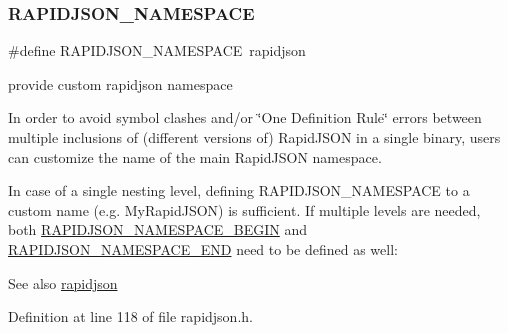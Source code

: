\subsubsection{\texorpdfstring{RAPIDJSON\_NAMESPACE}{RAPIDJSON\_NAMESPACE}}
{\footnotesize\ttfamily \#define R\+A\+P\+I\+D\+J\+S\+O\+N\+\_\+\+N\+A\+M\+E\+S\+P\+A\+CE~rapidjson}



provide custom rapidjson namespace 

In order to avoid symbol clashes and/or \char`\"{}\+One Definition Rule\char`\"{} errors between multiple inclusions of (different versions of) Rapid\+J\+S\+ON in a single binary, users can customize the name of the main Rapid\+J\+S\+ON namespace.

In case of a single nesting level, defining {\ttfamily R\+A\+P\+I\+D\+J\+S\+O\+N\+\_\+\+N\+A\+M\+E\+S\+P\+A\+CE} to a custom name (e.\+g. {\ttfamily My\+Rapid\+J\+S\+ON}) is sufficient. If multiple levels are needed, both \mbox{\hyperlink{group___r_a_p_i_d_j_s_o_n___c_o_n_f_i_g_gad3806c8251fdc7da9618b7e922674ffc}{R\+A\+P\+I\+D\+J\+S\+O\+N\+\_\+\+N\+A\+M\+E\+S\+P\+A\+C\+E\+\_\+\+B\+E\+G\+IN}} and \mbox{\hyperlink{group___r_a_p_i_d_j_s_o_n___c_o_n_f_i_g_gaf18f052a98b9f5df5448d39484b743c1}{R\+A\+P\+I\+D\+J\+S\+O\+N\+\_\+\+N\+A\+M\+E\+S\+P\+A\+C\+E\+\_\+\+E\+ND}} need to be defined as well\+:


\begin{DoxyCode}{0}
\DoxyCodeLine{\textcolor{comment}{// in some .cpp file}}
\DoxyCodeLine{\textcolor{preprocessor}{\#define RAPIDJSON\_NAMESPACE my::rapidjson}}
\DoxyCodeLine{\textcolor{preprocessor}{\#define RAPIDJSON\_NAMESPACE\_END   \} \}}}
\DoxyCodeLine{\textcolor{preprocessor}{\#include "rapidjson/..."}}
\end{DoxyCode}


\begin{DoxySeeAlso}{See also}
\mbox{\hyperlink{namespacerapidjson}{rapidjson}} 
\end{DoxySeeAlso}


Definition at line 118 of file rapidjson.\+h.

\mbox{\label{group___r_a_p_i_d_j_s_o_n___c_o_n_f_i_g_gad3806c8251fdc7da9618b7e922674ffc}} 
